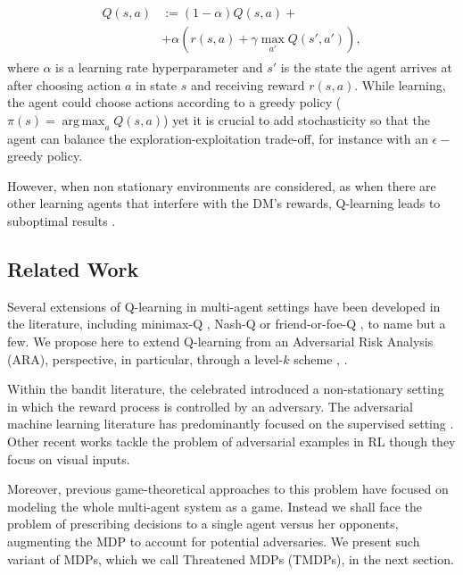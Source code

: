 \documentclass[letterpaper]{article} %
\DeclareMathOperator*{\argmax}{arg\,max}
\begin{document}
\begin{align}\label{eq:ql}
\begin{split}
Q(s,a) &:= (1 - \alpha) Q(s, a)  + \\ &+ \alpha \left(r(s,a) + \gamma\max_{a'} Q(s', a') \right),
\end{split}
\end{align}
where $\alpha$ is a learning rate hyperparameter
and $s'$ is the state the agent arrives at after choosing action $a$ in 
state $s$ and receiving reward $r(s,a)$. While learning, the agent
could choose actions according to a greedy policy ($\pi(s) = \argmax_a Q(s, a) $) yet it
is crucial to add stochasticity so that the agent can balance the exploration-exploitation trade-off, for instance with an $\epsilon-$greedy policy.

However, when non stationary environments are considered, as when there are other 
learning agents that interfere with the DM's rewards, Q-learning leads
to suboptimal results \cite{marl_over}. 


\subsection{Related Work}


Several extensions of Q-learning in multi-agent settings have been developed 
in the literature, including minimax-Q \cite{littman1994markov}, 
Nash-Q \cite{hu2003nash} or friend-or-foe-Q \cite{littman2001friend},
to name but a few. 
We propose here to extend Q-learning from an Adversarial Risk Analysis (ARA), 
\cite{rios2009adversarial} perspective, in particular, through 
a level-$k$ scheme \cite{stahl1994experimental}, \cite{stahl1995players}.

Within the bandit literature, the celebrated \cite{auer1995gambling} introduced 
a non-stationary setting in which the reward process is controlled by an adversary.
The adversarial machine learning literature has predominantly focused on the supervised setting \cite{biggio2017wild}. 
Other recent works tackle the problem of adversarial examples in RL \cite{huang2017adversarial,lin2017tactics} though they focus on visual inputs. 

Moreover, previous game-theoretical approaches to this problem have focused on modeling the whole multi-agent system as a game. Instead we shall face the problem of prescribing decisions to a single agent
versus her opponents, augmenting the MDP to account for potential adversaries. We present such variant of MDPs,
which we call Threatened MDPs (TMDPs), in the next section.
\end{document}
